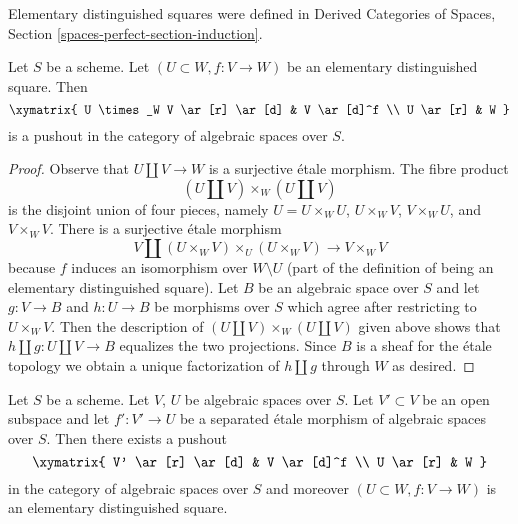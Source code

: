 \noindent
Elementary distinguished squares were defined in
Derived Categories of Spaces, Section \ref{spaces-perfect-section-induction}.

\begin{lemma}
\label{lemma-elementary-distinguished-square-pushout}
Let $S$ be a scheme. Let $(U \subset W, f : V \to W)$ be
an elementary distinguished square. Then
$$
\xymatrix{
U \times_W V \ar[r] \ar[d] &
V \ar[d]^f \\
U \ar[r] & W
}
$$
is a pushout in the category of algebraic spaces over $S$.
\end{lemma}

\begin{proof}
Observe that $U \amalg V \to W$ is a surjective \'etale morphism.
The fibre product
$$
(U \amalg V) \times_W (U \amalg V)
$$
is the disjoint union of four pieces, namely
$U = U \times_W U$, $U \times_W V$, $V \times_W U$,
and $V \times_W V$.
There is a surjective \'etale morphism
$$
V \amalg (U \times_W V) \times_U (U \times_W V) \longrightarrow V \times_W V
$$
because $f$ induces an isomorphism over $W \setminus U$
(part of the definition of being an elementary distinguished square).
Let $B$ be an algebraic space over $S$ and let
$g : V \to B$ and $h : U \to B$ be morphisms over
$S$ which agree after restricting to $U \times_W V$.
Then the description of
$(U \amalg V) \times_W (U \amalg V)$ given above
shows that $h \amalg g : U \amalg V \to B$
equalizes the two projections. Since $B$ is a sheaf
for the \'etale topology we obtain a unique
factorization of $h \amalg g$ through $W$ as desired.
\end{proof}

\begin{lemma}
\label{lemma-construct-elementary-distinguished-square}
Let $S$ be a scheme. Let $V$, $U$ be algebraic spaces over $S$.
Let $V' \subset V$ be an open subspace and let $f' : V' \to U$ be a
separated \'etale morphism of algebraic spaces over $S$.
Then there exists a pushout
$$
\xymatrix{
V' \ar[r] \ar[d] &
V \ar[d]^f \\
U \ar[r] & W
}
$$
in the category of algebraic spaces over $S$ and moreover
$(U \subset W, f : V \to W)$ is an elementary distinguished square.
\end{lemma}

